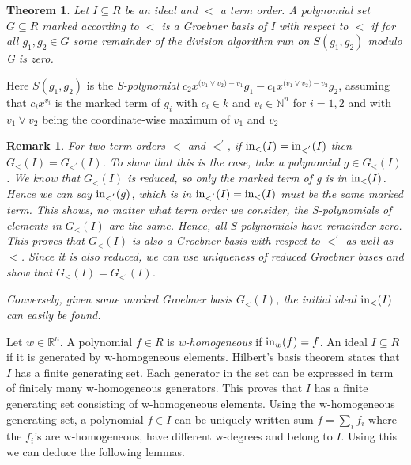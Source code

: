 \documentclass[12pt,a4paper]{report}
\newtheorem{theorem}{Theorem}
\newtheorem{remark}{Remark}
\begin{document}
\begin{theorem}
Let $I \subseteq R$ be an ideal and $<$ a term order. A polynomial set $G \subseteq R$ marked according to $<$ is a Groebner basis of I with respect to $<$ if for all $g_{1}, g_{2} \in G$ some remainder of the division algorithm run on $S(g_{1}, g_{2})$ modulo G is zero. 
\end{theorem}
Here $S(g_{1}, g_{2})$ is the \emph{S-polynomial} $c_{2} x^{({v_{1} \vee v_{2})} - v_{1}} g_{1} - c_{1} x^{({v_{1} \vee v_{2})} - v_{2}} g_{2}$, assuming that $c_{i} x^{v_{i}}$ is the marked term of $g_{i}$ with $c_{i} \in k$ and $v_{i} \in \mathbb N^{n}$ for $i = 1, 2$ and with $v_{1} \vee v_{2}$ being the coordinate-wise maximum of $v_{1}$ and $v_{2}$



\begin{remark}
For two term orders $<$ and $<^{'}$, if $\operatorname{in}_{<} (I) = \operatorname{in}_{{<}^{'}} (I)$ then $G_{<} (I) = G_{{<}^{'}} (I)$. To show that this is the case, take a polynomial $g \in G_{<} (I)$. We know that $G_{<} (I)$ is reduced, so only the marked term of g is in $\operatorname{in}_{<} (I)$. Hence we can say $\operatorname{in}_{{<}^{'}} (g)$, which is in $\operatorname{in}_{{<}^{'}} (I) = \operatorname{in}_{<} (I)$ must be the same marked term. This shows, no matter what term order we consider, the S-polynomials of elements in $G_{<} (I)$ are the same. Hence, all S-polynomials have remainder zero. This proves that $G_{<} (I)$ is also a Groebner basis with respect to $<^{'}$ as well as $<$. Since it is also reduced, we can use uniqueness of reduced Groebner bases and show that $G_{<} (I) = G_{{<}^{'}} (I)$.

Conversely, given some marked Groebner basis $G_{<} (I)$, the initial ideal $\operatorname{in}_{<} (I)$ can easily be found.
\end{remark}

Let $w \in \mathbb R^{n}$. A polynomial $f \in R$ is \emph{w-homogeneous} if $\operatorname{in}_{w} (f) = f$. An ideal $I \subseteq R$ if it is generated by w-homogeneous elements. Hilbert's basis theorem states that $I$ has a finite generating set. Each generator in the set can be expressed in term of finitely many w-homogeneous generators. This proves that $I$ has a finite generating set consisting of w-homogeneous elements. Using the w-homogeneous generating set, a polynomial $f \in I$ can be uniquely written sum $f = \sum_{i} f_{i}$ where the $f_{i}$'s are w-homogeneous, have different w-degrees and belong to $I$. Using this we can deduce the following lemmas.
\end{document}
